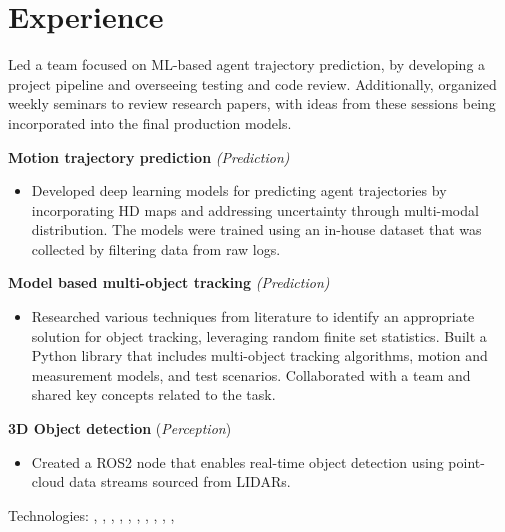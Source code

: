 \section*{\sectionformat Experience}
% 

Led a team focused on ML-based agent trajectory prediction, by developing a project pipeline and overseeing testing and code review. Additionally, organized weekly seminars to review research papers, with ideas from these sessions being incorporated into the final production models.

\textbf{Motion trajectory prediction} \textit{(Prediction)}
\begin{itemize}
    \item Developed deep learning models for predicting agent trajectories by incorporating HD maps and addressing uncertainty through multi-modal distribution. The models were trained using an in-house dataset that was collected by filtering data from raw logs.
\end{itemize}

\textbf{Model based multi-object tracking} \textit{(Prediction)}
\begin{itemize}
    \item Researched various techniques from literature to identify an appropriate solution for object tracking, leveraging random finite set statistics. Built a Python library that includes multi-object tracking algorithms, motion and measurement models, and test scenarios. Collaborated with a team and shared key concepts related to the task.
\end{itemize}

\textbf{3D Object detection} (\textit{Perception})
\begin{itemize}
    \item Created a ROS2 node that enables real-time object detection using point-cloud data streams sourced from LIDARs.
\end{itemize}
Technologies: , , , , , , , , , , 
\horizontalline
% 

